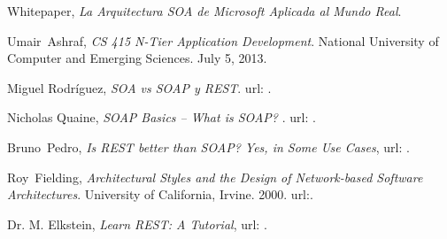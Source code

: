 \documentclass[conference]{IEEEtran}
\begin{document}
\begin{thebibliography}{1}


  Whitepaper, \emph{La Arquitectura SOA de Microsoft Aplicada al Mundo
  Real}.

  Umair~Ashraf, \emph{CS 415 N-Tier Application Development}. National
  University of Computer and Emerging Sciences. July 5, 2013.


  Miguel Rodríguez, \emph{SOA vs SOAP y REST}. url:
  \texttt{}.

  Nicholas Quaine, \emph{ SOAP Basics -- What is SOAP? }. url:
  \texttt{}.


Bruno~Pedro, \emph{Is REST better than SOAP? Yes, in Some Use Cases},
url:
\texttt{}.

  Roy~Fielding, \emph{Architectural Styles and the Design of
    Network-based Software Architectures}. University of California,
  Irvine. 2000. url:\texttt{}.


  Dr. M. Elkstein, \emph{Learn REST: A Tutorial},
url: \texttt{}.


\end{thebibliography}

\end{document}
